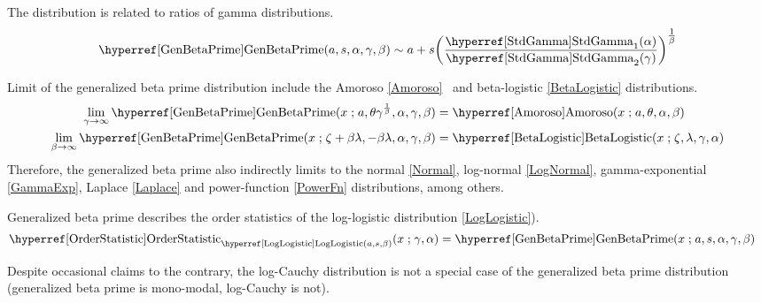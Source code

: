 The distribution is related to ratios of gamma distributions.
\[
\opr{GenBetaPrime}(a,s,\alpha,\gamma,\beta) \sim a+ s\Left( \frac{\opr{StdGamma}_1(\alpha)}{\opr{StdGamma}_2(\gamma) } \Right)^{\tfrac{1}{\beta}} \checked
\notag
\]

Limit of the generalized beta prime distribution include the Amoroso \eqref{Amoroso}~\cite{McDonald1984} and beta-logistic \eqref{BetaLogistic} distributions.
\begin{align*}
\lim_{\gamma\rightarrow\infty} \opr{GenBetaPrime}(x\given a, \theta \gamma^{\frac{1}{\beta}} ,\alpha, \gamma, \beta )  
& = \opr{Amoroso}(x\given a,\theta,\alpha, \beta) \checked \\
\lim_{\beta\rightarrow\infty}  \opr{GenBetaPrime}(x\given  \pLoc+\beta\pScale, -\beta \pScale, \alpha, \gamma, \beta)  
 & = \opr{BetaLogistic}(x\given \pLoc,\pScale, \gamma, \alpha) \checked
\end{align*}
Therefore, the generalized beta prime also indirectly limits to the normal \eqref{Normal}, log-normal \eqref{LogNormal}, gamma-exponential \eqref{GammaExp}, Laplace \eqref{Laplace} and power-function \eqref{PowerFn} distributions, among others.

Generalized beta prime describes the order statistics  of the log-logistic distribution \eqref{LogLogistic}). 
\begin{align*}
 \opr{OrderStatistic}_{\opr{LogLogistic}(a,s,\beta)}(x \given \gamma, \alpha ) & =  \opr{GenBetaPrime}(x\given a, s, \alpha, \gamma, \beta)  \checked
\end{align*}


Despite occasional claims to the contrary,
the log-Cauchy distribution is not a special case of the generalized beta prime distribution (generalized beta prime is mono-modal, log-Cauchy is not).





